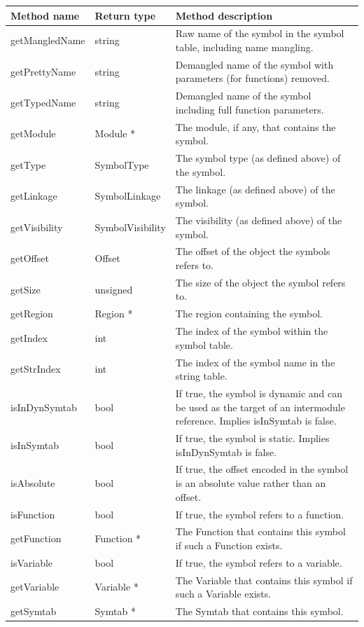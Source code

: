 \begin{tabularx}{\textwidth}{llX}
\toprule
Method name & Return type & Method description \\
\midrule
getMangledName & string & Raw name of the symbol in the symbol table, including name mangling. \\
getPrettyName & string & Demangled name of the symbol with parameters (for functions) removed. \\
getTypedName & string & Demangled name of the symbol including full function parameters. \\
getModule & Module * & The module, if any, that contains the symbol. \\
getType & SymbolType & The symbol type (as defined above) of the symbol. \\
getLinkage & SymbolLinkage & The linkage (as defined above) of the symbol. \\
getVisibility & SymbolVisibility & The visibility (as defined above) of the symbol. \\
getOffset & Offset & The offset of the object the symbols refers to. \\
getSize & unsigned & The size of the object the symbol refers to. \\
getRegion & Region * & The region containing the symbol. \\
getIndex & int & The index of the symbol within the symbol table. \\
getStrIndex & int & The index of the symbol name in the string table. \\
isInDynSymtab & bool & If true, the symbol is dynamic and can be used as the target of an intermodule reference. Implies isInSymtab is false.  \\
isInSymtab & bool & If true, the symbol is static. Implies isInDynSymtab is false. \\
isAbsolute & bool & If true, the offset encoded in the symbol is an absolute value rather than an offset. \\
isFunction & bool & If true, the symbol refers to a function. \\
getFunction & Function * & The Function that contains this symbol if such a Function exists. \\
isVariable & bool & If true, the symbol refers to a variable. \\
getVariable & Variable * & The Variable that contains this symbol if such a Variable exists. \\
getSymtab & Symtab * & The Symtab that contains this symbol.  \\

\end{tabularx}
